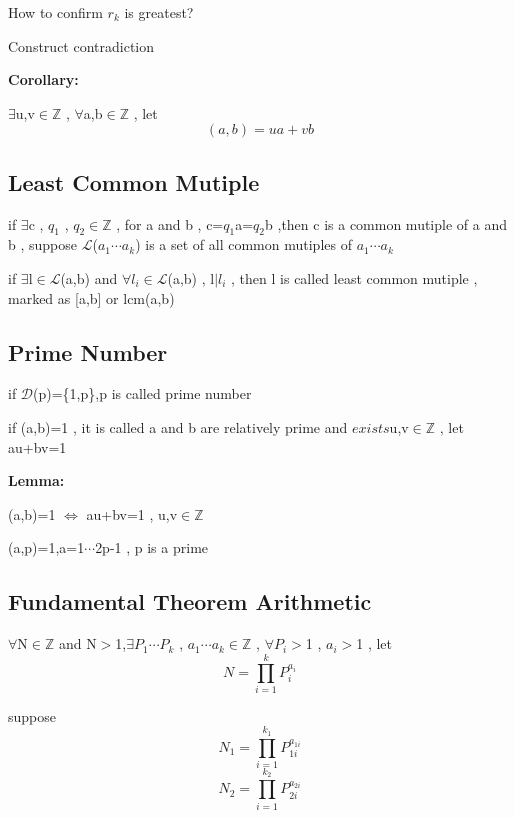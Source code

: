 \documentclass{ctexart}
\begin{document}
How to confirm \(r_k\) is greatest?

Construct contradiction

\vspace{12 pt}
\textbf{Corollary:}

\(\exists\)u,v\(\in\)\(\mathbb{Z}\) , \(\forall\)a,b\(\in\)\(\mathbb{Z}\) , let 
\[(a,b)=ua+vb\]

\vspace{12 pt}
\subsection{Least Common Mutiple}

if \(\exists\)c , \(q_1\) , \(q_2\)\(\in\)\(\mathbb{Z}\) , for a and b , c=\(q_1\)a=\(q_2\)b ,then c is a common mutiple of a and b , suppose \(\mathcal{L}\)(\(a_1\)\(\cdots\)\(a_k\)) is a set of all common mutiples of \(a_1\)\(\cdots\)\(a_k\)

if \(\exists\)l\(\in\)\(\mathcal{L}\)(a,b) and \(\forall\)\(l_i\)\(\in\)\(\mathcal{L}\)(a,b) , l\(\mid\)\(l_i\) , then l is called least common mutiple , marked as [a,b] or lcm(a,b)

\vspace{12 pt}
\subsection{Prime Number}

if \(\mathcal{D}\)(p)=\{1,p\},p is called prime number

if (a,b)=1 , it is called a and b are relatively prime and \(exists\)u,v\(\in\)\(\mathbb{Z}\) , let au+bv=1

\textbf{Lemma:}

(a,b)=1 \(\Leftrightarrow\) au+bv=1 , u,v\(\in\)\(\mathbb{Z}\)

\vspace{12 pt}
(a,p)=1,a=1\(\cdots\)2p-1 , p is a prime

\vspace{12 pt}
\subsection{Fundamental Theorem Arithmetic}

\(\forall\)N\(\in\)\(\mathbb{Z}\) and N$>$1,\(\exists\)\(P_1\)\(\cdots\)\(P_k\) , \(a_1\)\(\cdots\)\(a_k\)\(\in\)\(\mathbb{Z}\) ,  \(\forall\)\(P_i\)$>$1 , \(a_i\)$>$1 , let
\[N=\prod_{i=1}^{k}P_{i}^{a_i}\]

\vspace{12 pt}
suppose
\[N_1=\prod_{i=1}^{k_1}P_{1i}^{a_{1i}}\]
\[N_2=\prod_{i=1}^{k_2}P_{2i}^{a_{2i}}\]
\end{document}
